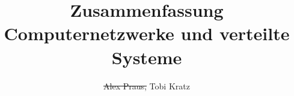 \documentclass[
	ngerman,
	accentcolor=9c,%
	type=intern,
	marginpar=false
	]{tudapub}
\begin{document}
\title{Zusammenfassung Computernetzwerke und verteilte Systeme}
\author{\sout{Alex Praus,} Tobi Kratz}

\maketitle

\tableofcontents
















\end{document}
